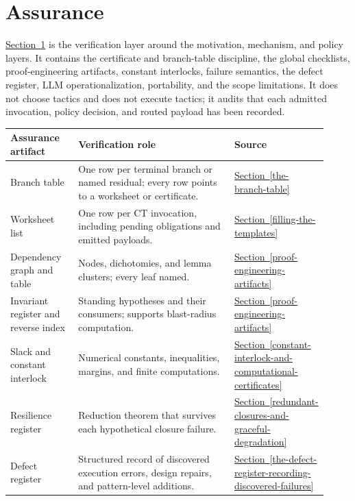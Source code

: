 \documentclass[
  11pt,
]{article}
\theoremstyle{definition}
\newcommand{\secref}[1]{\hyperref[#1]{Section~\ref*{#1}}}
\begin{document}
\section{Assurance}\label{part-iv-assurance}

\secref{part-iv-assurance} is the verification layer around the motivation, mechanism, and
policy layers. It contains the
certificate and branch-table discipline, the global checklists,
proof-engineering artifacts, constant interlocks, failure semantics, the
defect register, LLM operationalization, portability, and the scope
limitations. It does not choose tactics and does not execute tactics; it
audits that each admitted invocation, policy decision, and routed
payload has been recorded.

\begingroup
\small
\setlength{\tabcolsep}{2pt}
\begin{longtable}[]{@{}
  >{\raggedright\arraybackslash}p{0.22\linewidth}
  >{\raggedright\arraybackslash}p{0.56\linewidth}
  >{\raggedright\arraybackslash}p{0.14\linewidth}@{}}
\toprule\noalign{}
Assurance artifact & Verification role & Source \\
\midrule\noalign{}
\endhead
\bottomrule\noalign{}
\endlastfoot
Branch table & One row per terminal branch or named residual; every row points to a worksheet or certificate. & \secref{the-branch-table} \\
Worksheet list & One row per CT invocation, including pending obligations and emitted payloads. & \secref{filling-the-templates} \\
Dependency graph and table & Nodes, dichotomies, and lemma clusters; every leaf named. & \secref{proof-engineering-artifacts} \\
Invariant register and reverse index & Standing hypotheses and their consumers; supports blast-radius computation. & \secref{proof-engineering-artifacts} \\
Slack and constant interlock & Numerical constants, inequalities, margins, and finite computations. & \secref{constant-interlock-and-computational-certificates} \\
Resilience register & Reduction theorem that survives each hypothetical closure failure. & \secref{redundant-closures-and-graceful-degradation} \\
Defect register & Structured record of discovered execution errors, design repairs, and pattern-level additions. & \secref{the-defect-register-recording-discovered-failures} \\
\end{longtable}
\endgroup
\end{document}
